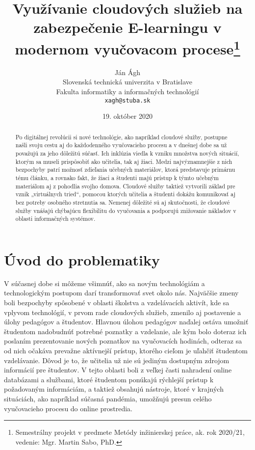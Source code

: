 \documentclass[10pt,slovak,a4paper]{article}%
\title{Využívanie cloudových služieb na zabezpečenie E-learningu v modernom vyučovacom procese\thanks{Semestrálny projekt v predmete Metódy inžinierskej práce, ak. rok 2020/21, vedenie: Mgr. Martin Sabo, PhD.}}
\author{Ján Ágh\\[2pt]
	{\small Slovenská technická univerzita v Bratislave}\\
	{\small Fakulta informatiky a informačných technológií}\\
	{\small \texttt{xagh@stuba.sk}}
	}
\date{\small 19. október 2020}
\begin{document}
\maketitle

\begin{abstract}

Po digitálnej revolúcii si nové technológie, ako napríklad cloudové služby, postupne
našli svoju cestu aj do každodenného vyučovacieho procesu a v dnešnej dobe sa už považujú
za jeho dôležitú súčasť. Ich inklúzia viedla k vzniku množstva nových situácií, ktorým sa
museli prispôsobiť ako učitelia, tak aj žiaci. Medzi najvýznamnejšie z nich bezpochyby patrí
možnosť zdieľania učebných materiálov, ktorá predstavuje primárnu tému článku, a rovnako
fakt, že žiaci a študenti majú prístup k týmto učebným materiálom aj z pohodlia svojho
domova. Cloudové služby taktiež vytvorili základ pre vznik „virtuálnych tried“, pomocou
ktorých učitelia a študenti dokážu komunikovať aj bez potreby osobného stretnutia sa.
Nemenej dôležité sú aj skutočnosti, že cloudové služby vnášajú chýbajúcu flexibilitu do
vyučovania a podporujú znižovanie nákladov v oblasti informačných systémov.
\end{abstract}



\section{Úvod do problematiky}


V súčasnej dobe si môžeme všimnúť, ako sa novým technológiám a technologickým postupom darí transformovať svet okolo nás. Najväčšie zmeny boli bezpochyby spôsobené v oblasti školstva a vzdelávacích aktivít, kde sa vplyvom technológií, v prvom rade cloudových služieb, zmenilo aj postavenie a úlohy pedagógov a študentov\cite{Koutsopoulos_schooloncloud}. Hlavnou úlohou pedagógov naďalej ostáva umožniť študentom nadobudnúť potrebné poznatky a vzdelanie, ale kým bolo doteraz ich poslaním prezentovanie nových poznatkov na vyučovacích hodinách, odteraz sa od nich očakáva prevažne aktívnejší prístup, ktorého cieľom je uľahčiť študentom vzdelávanie\cite{Koutsopoulos_schooloncloud}. Dôvod je to, že učitelia už nie sú jediným dostupným zdrojom informácií pre študentov. V tejto oblasti boli z veľkej časti nahradení online databázami a službami, ktoré študentom ponúkajú rýchlejší prístup k požadovaným informáciám, a taktiež obsahujú nástroje, ktoré v krajných situáciách, ako napríklad súčasná pandémia, umožňujú presun celého vyučovacieho procesu do online prostredia.
\end{document}
